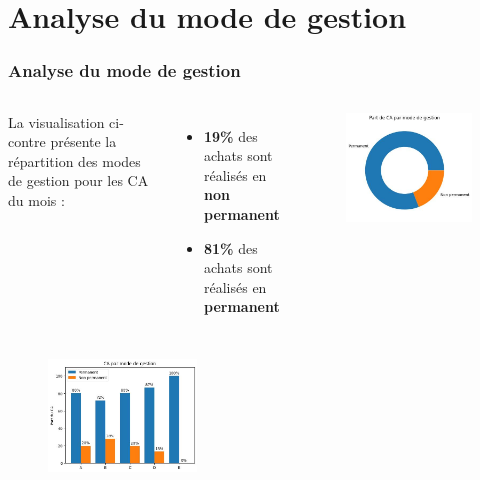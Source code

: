 \documentclass{beamer}
\begin{document}
    \section{Analyse du mode de gestion}

    \begin{frame}
        \tiny
        \frametitle{Analyse du mode de gestion}

        \begin{columns}
            La visualisation ci-contre présente la répartition des modes de gestion pour les CA du mois :

            \begin{itemize}
                \item \textbf{19\%} des achats sont réalisés en \textbf{non permanent}
                \item \textbf{81\%} des achats sont réalisés en \textbf{permanent}
            \end{itemize}

            \centering

            \begin{figure}
                \centering
                \includegraphics[width=1\textwidth]{assets/ca_total_par_mode_de_gestion}
            \end{figure}
        \end{columns}

        \begin{figure}[h]
            \centering
            \includegraphics[height=3cm]{assets/ca_magasins_par_mode_de_gestion}
        \end{figure}


\end{frame}
\end{document}
